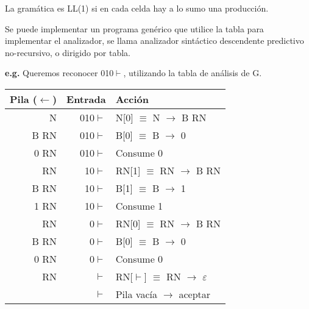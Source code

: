 \documentclass[\main/ApuntesPL.tex]{subfiles}
\begin{document}
      \par
      La gramática es LL(1) si en cada celda hay a lo sumo una producción.

      \bigskip
      \par
      Se puede implementar un programa genérico que utilice la tabla para implementar el analizador,
      se llama analizador sintáctico descendente predictivo no-recursivo, o dirigido por tabla.

      \bigskip
      \par
      \textbf{e.g.} Queremos reconocer 010$\vdash$, utilizando la tabla de análisis de G.
      \begin{center}
        \begin{tabular}{||r r l||}
          \hline
          Pila ($\leftarrow$) & Entrada & Acción \\ [0.5ex]
          \hline\hline
          N & 010$\vdash$ & N[0] $\equiv$ N $\rightarrow$ B RN\\
          \hline
          B RN & 010$\vdash$ & B[0] $\equiv$ B $\rightarrow$ 0\\
          \hline
          0 RN & 010$\vdash$ & Consume 0\\
          \hline
          RN & 10$\vdash$ & RN[1] $\equiv$ RN $\rightarrow$ B RN\\
          \hline
          B RN & 10$\vdash$ & B[1] $\equiv$ B $\rightarrow$ 1\\
          \hline
          1 RN & 10$\vdash$ & Consume 1\\
          \hline
          RN & 0$\vdash$ & RN[0] $\equiv$ RN $\rightarrow$ B RN\\
          \hline
          B RN & 0$\vdash$ & B[0] $\equiv$ B $\rightarrow$ 0\\
          \hline
          0 RN & 0$\vdash$ & Consume 0\\
          \hline
          RN & $\vdash$ & RN[$\vdash$] $\equiv$ RN $\rightarrow$ $\varepsilon$\\
          \hline
          & $\vdash$ & Pila vacía $\rightarrow$ aceptar\\ [1ex]
          \hline
        \end{tabular}
      \end{center}
\end{document}
